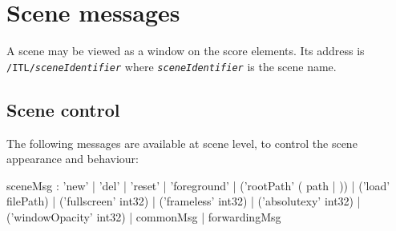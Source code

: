\documentclass[a4paper,twoside]{report}
\newcommand{\toplevel}[1]	{\chapter{#1}}
\newcommand{\sublevel}[1]	{\section{#1}}
\newcommand{\OSC}[1]		{\texttt{#1}}
\begin{document}
\toplevel{Scene messages}
\label{scene}
A scene may be viewed as a window on the score elements. Its address is \OSC{/ITL/\textit{sceneIdentifier}} where \OSC{\textit{sceneIdentifier}} is the scene name. 

\sublevel{Scene control}
The following messages are available at scene level, to control the scene appearance and behaviour:
\begin{rail}
sceneMsg :  'new'
			| 'del'
			| 'reset'
			| 'foreground'
			| ('rootPath' ( path | )) 
			| ('load' filePath)
			| ('fullscreen' int32)
			| ('frameless' int32)
			| ('absolutexy' int32)
			| ('windowOpacity' int32)
			| commonMsg
			| forwardingMsg
\end{rail}
\end{document}
